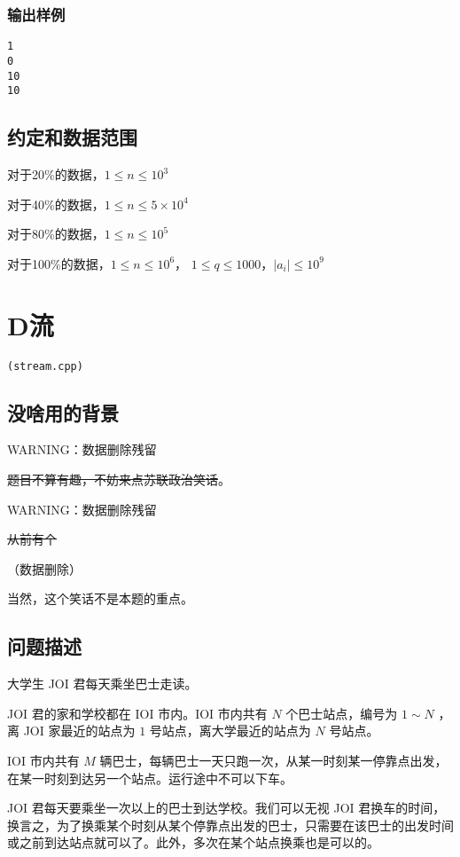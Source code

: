 \documentclass[UTF8]{ctexart}
\begin{document}
\subsubsection{输出样例}

\begin{lstlisting}
1
0
10
10
\end{lstlisting}


\subsection{约定和数据范围}

对于20\%的数据，$1\le n \le 10^3$

对于40\%的数据，$1\le n \le 5\times 10^4$

对于80\%的数据，$1\le n \le 10^5$

对于100\%的数据，$1\le n \le 10^6$， $1\le q\le 1000$，$|a_i| \le 10^9$


\newpage
\section{D流}
\begin{center}
\tt\large{(stream.cpp)}
\end{center}

\subsection{没啥用的背景}

WARNING：数据删除残留

\sout{题目不算有趣，不妨来点苏联政治笑话}。

WARNING：数据删除残留

\sout{从前有个}

（数据删除）

当然，这个笑话不是本题的重点。

\subsection{问题描述}

大学生 JOI 君每天乘坐巴士走读。

JOI 君的家和学校都在 IOI 市内。IOI 市内共有 $N$ 个巴士站点，编号为 $1\sim N$ ，离 JOI 家最近的站点为 $1$ 号站点，离大学最近的站点为 $N$ 号站点。

IOI 市内共有 $M$ 辆巴士，每辆巴士一天只跑一次，从某一时刻某一停靠点出发，在某一时刻到达另一个站点。运行途中不可以下车。

JOI 君每天要乘坐一次以上的巴士到达学校。我们可以无视 JOI 君换车的时间，换言之，为了换乘某个时刻从某个停靠点出发的巴士，只需要在该巴士的出发时间或之前到达站点就可以了。此外，多次在某个站点换乘也是可以的。
\end{document}
